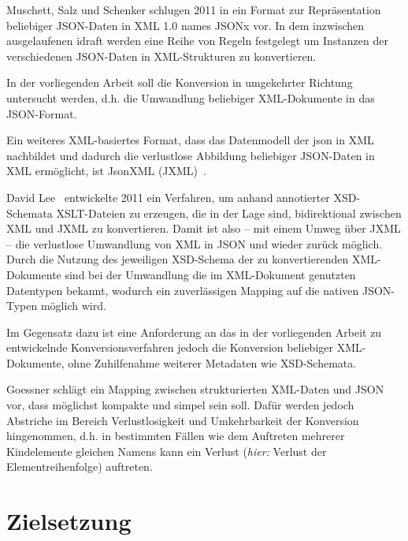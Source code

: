 Muschett, Salz und Schenker schlugen 2011 in ein Format zur Repräsentation beliebiger JSON-Daten in XML 1.0 names JSONx vor. In dem inzwischen ausgelaufenen \gls{idraft} werden eine Reihe von Regeln festgelegt um Instanzen der verschiedenen JSON-Daten in XML-Strukturen zu konvertieren.~\cite{jsonx}

In der vorliegenden Arbeit soll die Konversion in umgekehrter Richtung untersucht werden, d.h. die Umwandlung beliebiger XML-Dokumente in das JSON-Format.

Ein weiteres XML-basiertes Format, dass das Datenmodell der \acrfull{json} in XML nachbildet und dadurch die verlustlose Abbildung beliebiger JSON-Daten in XML ermöglicht, ist JsonXML (JXML)~\cite{jxml}.

David Lee~\cite{lee2011jxon} entwickelte 2011 ein Verfahren, um anhand annotierter XSD-Schemata XSLT-Dateien zu erzeugen, die in der Lage sind, bidirektional zwischen XML und JXML zu konvertieren.  Damit ist also -- mit einem Umweg über JXML -- die verlustlose Umwandlung von XML in JSON und wieder zurück möglich.
Durch die Nutzung des jeweiligen XSD-Schema der zu konvertierenden XML-Dokumente sind bei der Umwandlung die im XML-Dokument genutzten Datentypen bekannt, wodurch ein zuverlässigen Mapping auf die nativen JSON-Typen möglich wird.

Im Gegensatz dazu ist eine Anforderung an das in der vorliegenden Arbeit zu entwickelnde Konversionsverfahren jedoch die Konversion beliebiger XML-Dokumente, ohne Zuhilfenahme weiterer Metadaten wie XSD-Schemata.

Goessner schlägt ein Mapping zwischen strukturierten XML-Daten und JSON vor, dass möglichst kompakte und simpel sein soll. Dafür werden jedoch Abstriche im Bereich Verlustlosigkeit und Umkehrbarkeit der Konversion hingenommen, d.h. in bestimmten Fällen wie dem Auftreten mehrerer Kindelemente gleichen Namens kann ein Verlust (\emph{hier:} Verlust der Elementreihenfolge) auftreten.~\cite{goessner2006converting}



\section{Zielsetzung}

